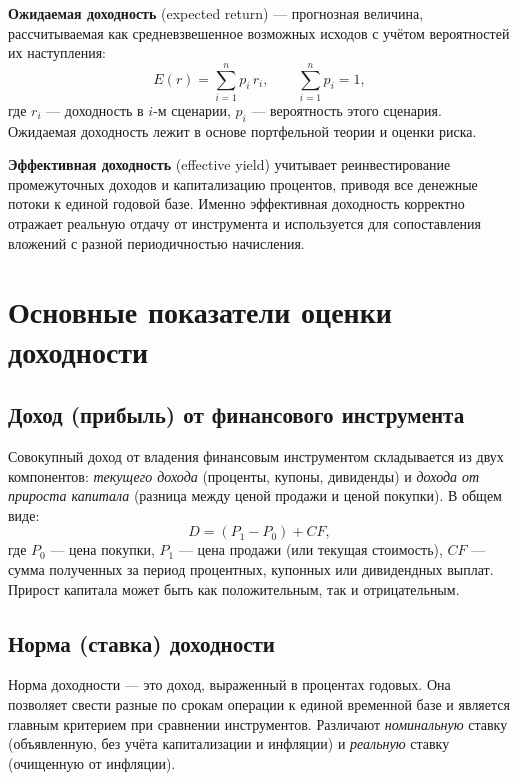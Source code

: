 \documentclass[14pt, a4paper]{extarticle}
\begin{document}
\textbf{Ожидаемая доходность} (expected return) — прогнозная величина,
рассчитываемая как средневзвешенное возможных исходов с учётом вероятностей их
наступления:
\begin{equation}
  E(r) = \sum_{i=1}^{n} p_i \, r_i, \qquad \sum_{i=1}^{n} p_i = 1,
\end{equation}
где $r_i$ — доходность в $i$-м сценарии, $p_i$ — вероятность этого сценария.
Ожидаемая доходность лежит в основе портфельной теории и оценки риска.

\textbf{Эффективная доходность} (effective yield) учитывает реинвестирование
промежуточных доходов и капитализацию процентов, приводя все денежные потоки к
единой годовой базе. Именно эффективная доходность корректно отражает реальную
отдачу от инструмента и используется для сопоставления вложений с разной
периодичностью начисления.

\section{Основные показатели оценки доходности}

\subsection{Доход (прибыль) от финансового инструмента}

Совокупный доход от владения финансовым инструментом складывается из двух
компонентов: \emph{текущего дохода} (проценты, купоны, дивиденды) и
\emph{дохода от прироста капитала} (разница между ценой продажи и ценой
покупки). В общем виде:
\begin{equation}
  D = (P_1 - P_0) + CF,
\end{equation}
где $P_0$ — цена покупки, $P_1$ — цена продажи (или текущая стоимость), $CF$ —
сумма полученных за период процентных, купонных или дивидендных выплат. Прирост
капитала может быть как положительным, так и отрицательным.

\subsection{Норма (ставка) доходности}

Норма доходности — это доход, выраженный в процентах годовых. Она позволяет
свести разные по срокам операции к единой временной базе и является главным
критерием при сравнении инструментов. Различают \emph{номинальную} ставку
(объявленную, без учёта капитализации и инфляции) и \emph{реальную} ставку
(очищенную от инфляции).
\end{document}
